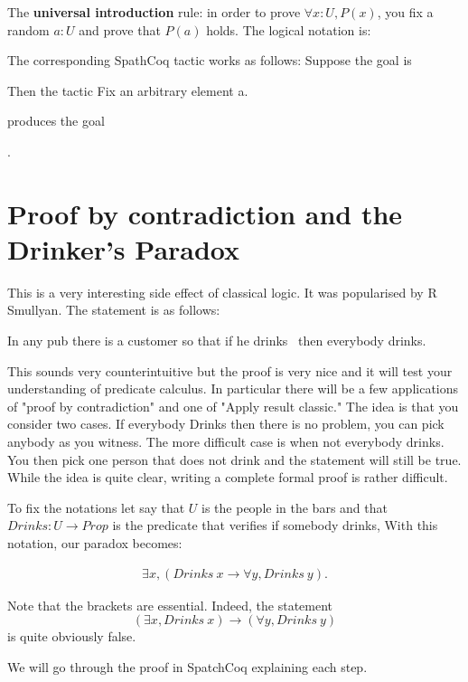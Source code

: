 The {\bf universal introduction} rule: in order to prove $\forall x:U, P(x)$, you fix a random $a:U$ and prove that $P(a)$ holds. The logical notation is:



The corresponding SpathCoq tactic  works as follows:
Suppose the goal is


Then the tactic 
Fix an arbitrary element a.

produces the goal

.

  
\section{Proof by contradiction and the Drinker's Paradox}\label{sec:drinker}


This is a very interesting side effect of classical logic. It was popularised by R Smullyan. The statement is as follows:

In any pub there is a customer so that if he drinks \ then everybody drinks. 


This sounds very counterintuitive but the proof is very nice and it will test your understanding of predicate calculus. In particular there will be a few applications of "proof by contradiction" and one of "Apply result classic." The idea is that you consider two cases. If everybody Drinks  then there is no problem, you can pick anybody as you witness. The more difficult case is when not everybody drinks. You then pick one person that does not drink and the statement will still be true. While the idea is quite clear, writing a complete formal proof is rather difficult. 


To fix the notations let say that $U$ is the people in the bars and that $Drinks: U \rightarrow Prop$ is the  predicate that verifies if somebody drinks, With this notation, our paradox becomes:

\begin{align}\label{al:drinker}\exists x,  (Drinks \ x \rightarrow \forall y, Drinks \ y).\end{align}

Note that the brackets are essential. Indeed, the statement 
$$(\exists x,  Drinks\  x) \rightarrow (\forall y, Drinks \  y)$$
is quite obviously false.

We will go through the proof in SpatchCoq explaining each step.

